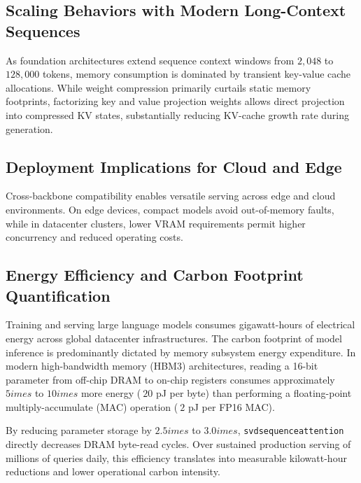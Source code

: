 \subsection{Scaling Behaviors with Modern Long-Context Sequences}
As foundation architectures extend sequence context windows from $2{,}048$ to $128{,}000$ tokens, memory consumption is dominated by transient key-value cache allocations. While weight compression primarily curtails static memory footprints, factorizing key and value projection weights allows direct projection into compressed KV states, substantially reducing KV-cache growth rate during generation.

\subsection{Deployment Implications for Cloud and Edge}
Cross-backbone compatibility enables versatile serving across edge and cloud environments. On edge devices, compact models avoid out-of-memory faults, while in datacenter clusters, lower VRAM requirements permit higher concurrency and reduced operating costs.

\subsection{Energy Efficiency and Carbon Footprint Quantification}
Training and serving large language models consumes gigawatt-hours of electrical energy across global datacenter infrastructures. The carbon footprint of model inference is predominantly dictated by memory subsystem energy expenditure. In modern high-bandwidth memory (HBM3) architectures, reading a 16-bit parameter from off-chip DRAM to on-chip registers consumes approximately $5	imes$ to $10	imes$ more energy ($~20$ pJ per byte) than performing a floating-point multiply-accumulate (MAC) operation ($~2$ pJ per FP16 MAC).

By reducing parameter storage by $2.5	imes$ to $3.0	imes$, \texttt{svdsequenceattention} directly decreases DRAM byte-read cycles. Over sustained production serving of millions of queries daily, this efficiency translates into measurable kilowatt-hour reductions and lower operational carbon intensity.
